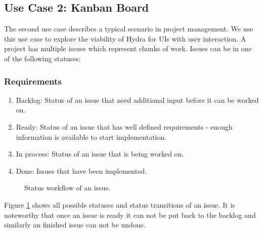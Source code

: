 \subsection{Use Case 2: Kanban Board}
The second use case describes a typical scenario in project management. We use this use case to explore the viability of Hydra for UIs with user interaction. A project has multiple issues which represent chunks of work. Issues can be in one of the following statuses:

\subsubsection{Requirements}

\begin{enumerate}
  \item Backlog: Status of an issue that need additional input before it can be worked on.
  \item Ready: Status of an issue that has well defined requirements - enough information is available to start implementation.
  \item In process: Status of an issue that is being worked on.
  \item Done: Issues that have been implemented.
\end{enumerate}

\begin{figure}[!htb]
  \caption{Status workflow of an issue.}
  \label{fig:statetransition}
\end{figure}

Figure \ref{fig:statetransition} shows all possible statuses and status transitions of an issue. It is noteworthy that once an issue is ready it can not be put back to the backlog and similarly an finished issue can not be undone.

